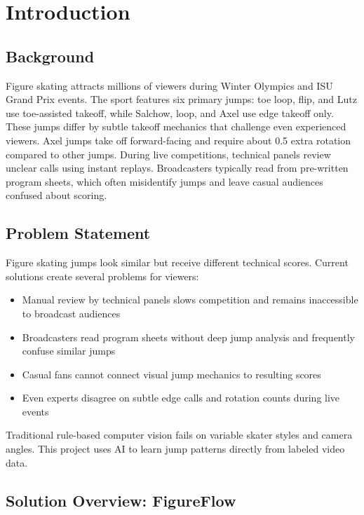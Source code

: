 \chapter{Introduction}
\label{chap:introduction}

\section{Background}
\label{section:background}

Figure skating attracts millions of viewers during Winter Olympics and ISU Grand Prix events. The sport features six primary jumps: toe loop, flip, and Lutz use toe-assisted takeoff, while Salchow, loop, and Axel use edge takeoff only. These jumps differ by subtle takeoff mechanics that challenge even experienced viewers. Axel jumps take off forward-facing and require about 0.5 extra rotation compared to other jumps. During live competitions, technical panels review unclear calls using instant replays. Broadcasters typically read from pre-written program sheets, which often misidentify jumps and leave casual audiences confused about scoring.

\section{Problem Statement}
\label{section:problem-statement}

Figure skating jumps look similar but receive different technical scores. Current solutions create several problems for viewers:

\begin{itemize}
\item Manual review by technical panels slows competition and remains inaccessible to broadcast audiences
\item Broadcasters read program sheets without deep jump analysis and frequently confuse similar jumps
\item Casual fans cannot connect visual jump mechanics to resulting scores
\item Even experts disagree on subtle edge calls and rotation counts during live events
\end{itemize}

Traditional rule-based computer vision fails on variable skater styles and camera angles. This project uses AI to learn jump patterns directly from labeled video data.

\section{Solution Overview: FigureFlow}
\label{section:solution-overview}

